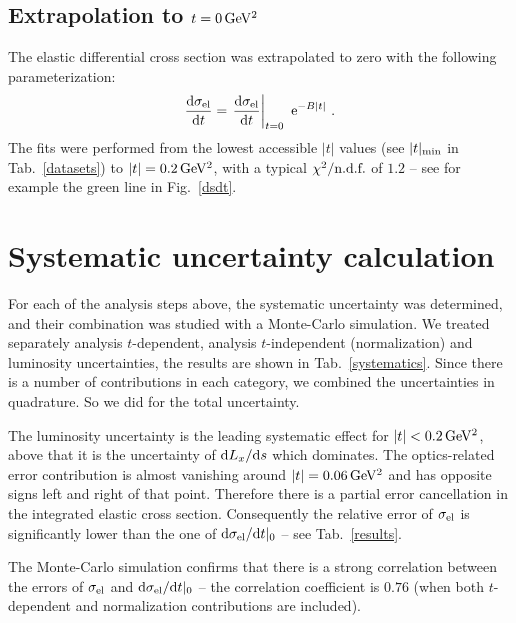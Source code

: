 \documentclass[doublecol]{../macros/epl2}
\def\d{{\rm d}}
\def\un#1{\,{\rm #1}}
\def\e{{\rm e}}
\begin{document}
\subsection{Extrapolation to $t=0\,\rm GeV^2$}

The elastic differential cross section was extrapolated to zero with the following parameterization:
\begin{equation}
\label{extrapolation}
{\d\sigma_{\rm el}\over \d t} = \left. {\d\sigma_{\rm el}\over \d t}\right|_{t=0} \ \e^{-B|t|}\ .
\end{equation}
The fits were performed from the lowest accessible $|t|$ values (see $|t|_{\rm min}$ in Tab.~\ref{datasets}) to $|t| = 0.2\un{GeV^2}$, with a typical $\chi^2/\hbox{n.d.f.}$ of $1.2$ -- see for example the green line in Fig.~\ref{dsdt}.

\section{Systematic uncertainty calculation}


For each of the analysis steps above, the systematic uncertainty was determined, and their combination was studied with a Monte-Carlo simulation. We treated separately analysis $t$-dependent, analysis $t$-independent (normalization) and luminosity uncertainties, the results are shown in Tab.~\ref{systematics}. Since there is a number of contributions in each category, we combined the uncertainties in quadrature. So we did for the total uncertainty.

The luminosity uncertainty is the leading systematic effect for $|t| < 0.2\un{GeV^2}$, above that it is the uncertainty of $\d L_x/\d s$ which dominates. The optics-related error contribution is almost vanishing around $|t| = 0.06\un{GeV^2}$ and has opposite signs left and right of that point. Therefore there is a partial error cancellation in the integrated elastic cross section. Consequently the relative error of $\sigma_{\rm el}$ is significantly lower than the one of $\d\sigma_{\rm el}/\d t|_0$ -- see Tab.~\ref{results}.

The Monte-Carlo simulation confirms that there is a strong correlation between the errors of $\sigma_{\rm el}$ and $\d\sigma_{\rm el}/\d t|_0$ -- the correlation coefficient is $0.76$ (when both $t$-dependent and normalization contributions are included).
\end{document}
